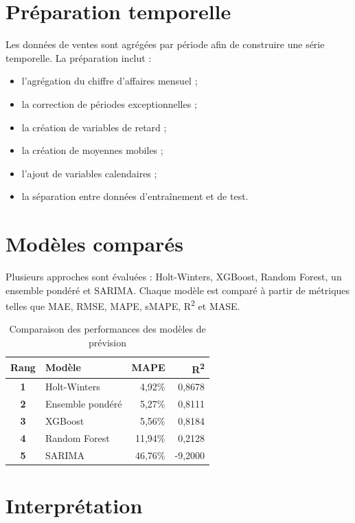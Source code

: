 \documentclass[12pt,a4paper,twoside]{report}
\begin{document}
\section{Préparation temporelle}

Les données de ventes sont agrégées par période afin de construire une série temporelle. La préparation inclut :

\begin{itemize}
  \item l'agrégation du chiffre d'affaires mensuel ;
  \item la correction de périodes exceptionnelles ;
  \item la création de variables de retard ;
  \item la création de moyennes mobiles ;
  \item l'ajout de variables calendaires ;
  \item la séparation entre données d'entraînement et de test.
\end{itemize}

\section{Modèles comparés}

Plusieurs approches sont évaluées : Holt-Winters, XGBoost, Random Forest, un ensemble pondéré et SARIMA. Chaque modèle est comparé à partir de métriques telles que MAE, RMSE, MAPE, sMAPE, R\textsuperscript{2} et MASE.

\begin{table}[H]
\centering
{}
\begin{tabular}{>{\bfseries}c l r r}
\toprule
\rowcolor{TableHeader}
\color{white}Rang & \color{white}Modèle & \color{white}MAPE & \color{white}R\textsuperscript{2} \\
\midrule
1 & Holt-Winters & 4,92\% & 0,8678 \\
2 & Ensemble pondéré & 5,27\% & 0,8111 \\
3 & XGBoost & 5,56\% & 0,8184 \\
4 & Random Forest & 11,94\% & 0,2128 \\
5 & SARIMA & 46,76\% & -9,2000 \\
\bottomrule
\end{tabular}
\caption{Comparaison des performances des modèles de prévision}
\end{table}

\section{Interprétation}
\end{document}
